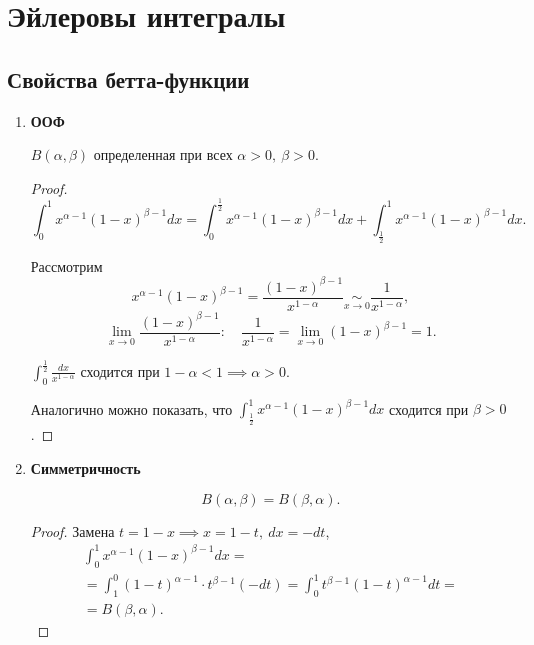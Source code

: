 \section{Эйлеровы интегралы}

\setcounter{subsection}{122}

\subsection{Свойства бетта-функции}

\begin{enumerate}
    \item \textbf{ООФ}

          \begin{statement}
              $ B(\alpha,\beta) $ определенная при всех $ \alpha > 0, \ \beta > 0 $.
          \end{statement}

          \begin{proof}
            \[
                \int_{0}^{1}x^{\alpha-1}(1-x)^{\beta-1}dx = \int_{0}^{\frac{1}{2}}x^{\alpha-1}(1-x)^{\beta-1}dx + \int_{\frac{1}{2}}^{1}x^{\alpha-1}(1-x)^{\beta-1}dx.
            \]

            Рассмотрим
            \[
                x^{\alpha-1}(1-x)^{\beta-1} = \frac{(1-x)^{\beta-1}}{x^{1-\alpha}} \underset{x \rightarrow 0}{\sim} \frac{1}{x^{1-\alpha}},
            \]
            \[
                \underset{x \rightarrow 0}{\lim}\frac{(1-x)^{\beta-1}}{x^{1-\alpha}}: \quad \frac{1}{x^{1-\alpha}} = \underset{x \rightarrow 0}{\lim}(1-x)^{\beta -1} = 1.
            \]

            $ \int_{0}^{\frac{1}{2}}\frac{dx}{x^{1-\alpha}} $ сходится при $ 1 - \alpha < 1 \implies \alpha > 0 $.

            Аналогично можно показать, что $ \int_{\frac{1}{2}}^{1}x^{\alpha-1}(1-x)^{\beta-1}dx $ сходится при $ \beta > 0 $.
        \end{proof}

    \item \textbf{Симметричность}

          \begin{statement}
              \[
                  B(\alpha,\beta) = B(\beta,\alpha).
              \]
          \end{statement}

          \begin{proof}
            Замена $ t = 1 - x \implies x = 1 - t, \ dx = -dt $,
            \begin{multline*}
                \int_{0}^{1}x^{\alpha-1}(1-x)^{\beta-1}dx = \\
                = \int_{1}^{0}(1-t)^{\alpha-1} \cdot t^{\beta-1}(-dt) = \int_{0}^{1}t^{\beta-1}(1-t)^{\alpha-1}dt = \\
                = B(\beta,\alpha).
            \end{multline*}
        \end{proof}


\end{enumerate}
